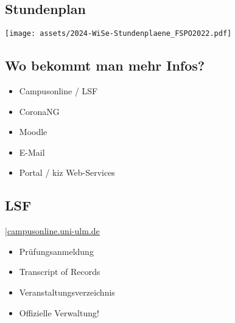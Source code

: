\documentclass[
	aspectratio=169, 
	10pt 
]{beamer}
\begin{document}
\subsection{Stundenplan}
\begin{frame}{\insertsubsection}
    \begin{fancycolumns}[widths={30}]
        \nextcolumn
        \texttt{[image: assets/2024-WiSe-Stundenplaene\_FSPO2022.pdf]}
    \end{fancycolumns} 
\end{frame}


\subsection{Wo bekommt man mehr Infos?}
\begin{frame}{\insertsubsection}
    \begin{itemize}
        \item Campusonline / LSF
        \item CoronaNG
        \item Moodle
        \item E-Mail
        \item Portal / kiz Web-Services
    \end{itemize}
\end{frame}

\subsection{LSF}
\begin{frame}{\insertsubsection \space|\space\underline{\href{https://campusonline.uni-ulm.de}{campusonline.uni-ulm.de}}}
    \begin{itemize}
        \item Prüfungsanmeldung
        \item Transcript of Records
        \item Veranstaltungsverzeichnis
        \item Offizielle Verwaltung!
    \end{itemize}
\end{frame}
\end{document}
